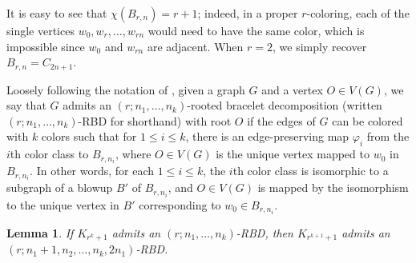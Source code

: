 \documentclass[10pt,a4paper]{amsart}
\newtheorem{lemma}[theorem]{Lemma}
\numberwithin{theorem}{section}
\renewcommand{\phi}{\varphi}
\renewcommand{\le}{\leqslant}
\begin{document}
It is easy to see that $\chi(B_{r,n})=r+1$; indeed, in a proper $r$-coloring, each of the single vertices $w_0,w_r,\dots,w_{rn}$ would need to have the same color, which is impossible since $w_0$ and $w_{rn}$ are adjacent. When $r=2$, we simply recover $B_{r,n}=C_{2n+1}$.

Loosely following the notation of \cite{DayJohnson2017MulticolourRamseyOddCycles}, given a graph $G$ and a vertex $O\in V(G)$, we say that $G$ admits an $(r;n_1,\dots,n_k)$-rooted bracelet decomposition (written $(r;n_1,\dots,n_k)$-RBD for shorthand) with root $O$ if the edges of $G$ can be colored with $k$ colors such that for $1\le i\le k$, there is an edge-preserving map $\phi_i$ from the $i$th color class to $B_{r,n_i}$, where $O\in V(G)$ is the unique vertex mapped to $w_0$ in $B_{r,n_i}$. In other words, for each $1\le i\le k$, the $i$th color class is isomorphic to a subgraph of a blowup $B'$ of $B_{r,n_i}$, and $O\in V(G)$ is mapped by the isomorphism to the unique vertex in $B'$ corresponding to $w_0\in B_{r,n_i}$.

\begin{lemma}\label{lem:induct}
    If $K_{r^k+1}$ admits an $(r;n_1,\dots,n_k)$-RBD, then $K_{r^{k+1}+1}$ admits an $(r;n_1+1,n_2,\dots,n_k,2n_1)$-RBD.
\end{lemma}
\end{document}
